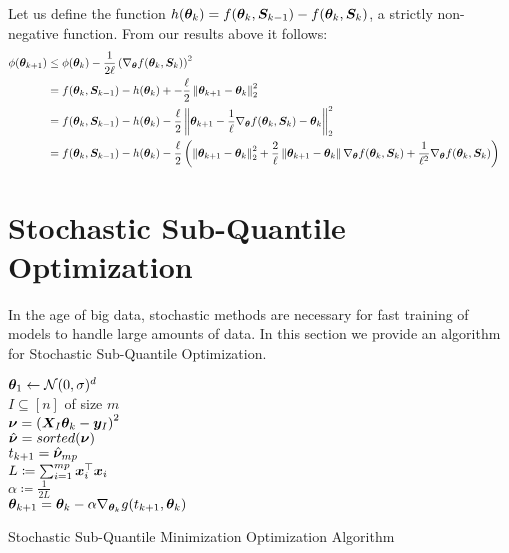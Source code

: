 \documentclass{article} %
\newcommand{\norm}[1]{\left\lVert#1\right\rVert}
\begin{document}
\begin{appendices}
	\bigskip
	Let us define the function $h({\bm{\theta}}_k) = f({\bm{\theta}}_k,{\bm{S}}_{k-1}) - f({\bm{\theta}}_k,{\bm{S}}_k)$, a strictly non-negative function. From our results above it follows:
	\begin{align*}
		\phi(\vtheta_{k+1}) &\leq \phi(\vtheta_k) - \frac{1}{2\ell}\left(\nabla_\vtheta f(\vtheta_k,\mS_k)\right)^2 &&\\
		&= f(\vtheta_k, \mS_{k-1}) - h(\vtheta_k) +  - \frac{\ell}{2}\norm{\vtheta_{k+1} - \vtheta_k}^2_2 \\
		&= f(\vtheta_k, \mS_{k-1}) - h(\vtheta_k) - \frac{\ell}{2}\norm{\vtheta_{k+1} - \frac{1}{\ell} \nabla_\vtheta f(\vtheta_k,\mS_k) - \vtheta_k}_2^2 &&\\
		&= f(\vtheta_k, \mS_{k-1}) - h(\vtheta_k) - \frac{\ell}{2}\left(\norm{\vtheta_{k+1}-\vtheta_k}_2^2 + \frac{2}{\ell}\norm{\vtheta_{k+1}-\vtheta_k}\nabla_\vtheta f(\vtheta_k,\mS_k) + \frac{1}{\ell^2}\nabla_\vtheta f(\vtheta_k,\mS_k)\right)
	\end{align*}
	\newpage
	
	\section{Stochastic Sub-Quantile Optimization}
	In the age of big data, stochastic methods are necessary for fast training of models to handle large amounts of data. In this section we provide an algorithm for Stochastic Sub-Quantile Optimization.
	\begin{algorithm}[H]
		\DontPrintSemicolon
		
		${\bm{\theta}}_1 \gets \mathcal{N}(0,\sigma)^d$\\
		{
			$I \subseteq \left[n\right]$ of size $m$\\
			$\displaystyle {\bm{\nu}} = \left({\bm{X}}_I{\bm{\theta}}_k - {\bm{y}}_I\right)^2$\\
			$\hat{{\bm{\nu}}} = sorted({\bm{\nu}})$\\
			$\displaystyle t_{k+1} = \hat{{\bm{\nu}}}_{mp}$\\
			$L \coloneqq \sum_{i=1}^{mp} {\bm{x}}_i^\top{\bm{x}}_i$\\
			$\alpha \coloneqq \frac{1}{2L}$\\
			$\displaystyle {\bm{\theta}}_{k+1} = {\bm{\theta}}_k - \alpha \nabla_{{\bm{\theta}}_k}g(t_{k+1},{\bm{\theta}}_k)$
		}
		\caption{Stochastic Sub-Quantile Minimization Optimization Algorithm}
		\label{alg:sqo-stochastic}
	\end{algorithm}
	

\end{appendices}
\end{document}
